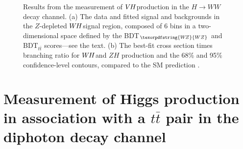 \documentclass{moriond}
\def\wh{\texorpdfstring{\ensuremath{W\kern -0.1em H}\xspace}{WH\xspace}}
\def\wz{\texorpdfstring{\ensuremath{W\kern -0.1em Z}\xspace}{WZ\xspace}}
\def\vh{\texorpdfstring{\ensuremath{V\kern -0.1em H}\xspace}{VH\xspace}}
\def\zh{\ensuremath{ZH}\xspace}
\def\ttbar{\ensuremath{t\bar{t}}\xspace}
\begin{document}
\begin{figure}[!htbp]
  \centering
  \caption{
    Results from the measurement of \vh production in the $H{\rightarrow}WW$ decay channel.
    (a) The data and fitted signal and backgrounds in the $Z$-depleted \wh signal region, composed of 6 bins in a
    two-dimensional space defined by the BDT$_{\wz}$ and BDT$_{\ttbar}$ scores---see the text.
    (b) The best-fit cross section times branching ratio for \wh and \zh production and the 68\% and
    95\% confidence-level contours, compared to the SM prediction \cite{HIGG-2017-14}.
  }
  \label{fig:ww_vh}
\end{figure}

\section{Measurement of Higgs production in association with a $t\bar t$ pair in the diphoton decay channel}\label{sec:ttH_yy}
\end{document}
